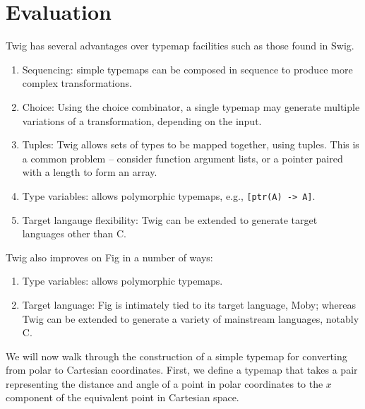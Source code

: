
\section{Evaluation}

Twig has several advantages over typemap facilities such as those found in Swig.

\begin{enumerate}

\item Sequencing: simple typemaps can be composed in sequence to produce more complex transformations.

\item Choice: Using the choice combinator, a single typemap may generate multiple variations of a transformation, depending on the input.

\item Tuples: Twig allows sets of types to be mapped together, using tuples. This is a common problem -- consider function argument lists, or a pointer paired with a length to form an array.

\item Type variables: allows polymorphic typemaps, e.g., \texttt{[ptr(A) -> A]}.
  
\item Target langauge flexibility: Twig can be extended to generate target languages other than C.

\end{enumerate}

Twig also improves on Fig in a number of ways:

\begin{enumerate}

\item Type variables: allows polymorphic typemaps.

\item Target language: Fig is intimately tied to its target language, Moby; whereas Twig can be extended to generate a variety of mainstream languages, notably C.

\end{enumerate}

We will now walk through the construction of a simple typemap for converting from polar to Cartesian coordinates. First, we define a typemap that takes a pair representing the distance and angle of a point in polar coordinates to the $x$ component of the equivalent point in Cartesian space.


